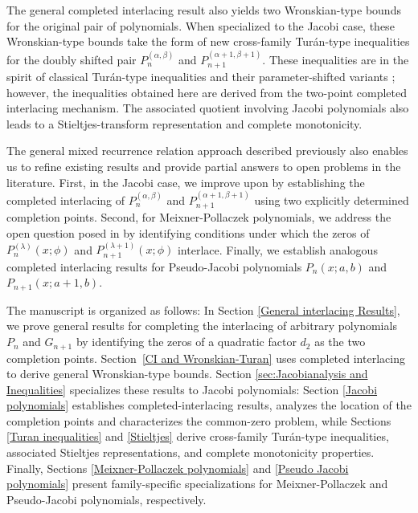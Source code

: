 \documentclass[final,3p,times,12pt]{elsarticle}
\numberwithin{equation}{section}  %
\begin{document}
		
		The general completed interlacing result also yields two  Wronskian-type bounds for the original pair of polynomials.  When specialized to the Jacobi case, these Wronskian-type bounds take the form of
			new cross-family Tur\'an-type inequalities for the doubly shifted pair
			$P_n^{(\alpha,\beta)}$ and $P_{n+1}^{(\alpha+1,\beta+1)}$.  These inequalities
			are in the spirit of classical Tur\'an-type inequalities and their
			parameter-shifted variants
			\cite{ BustozJMMA1981,Gasper1972-PAMS-Turaninequality-Jacobipolynomials, Szego1948-Turaninequality};
			however, the inequalities obtained here are derived from the two-point completed interlacing mechanism. The associated quotient involving Jacobi polynomials also leads to a Stieltjes-transform representation and complete monotonicity.
            
		
        The general mixed recurrence relation approach described previously also enables us to refine existing results and provide partial answers to open
		problems in the literature. First, in the Jacobi case, we improve upon
		 \cite[Theorem~2]{Arvesu-Driver-Littlejohn-RamanujanJ-2023} by establishing the completed interlacing of
		$P_n^{(\alpha,\beta)}$ and $P_{n+1}^{(\alpha+1,\beta+1)}$ using two explicitly
		determined completion points. Second, for Meixner-Pollaczek polynomials, we address the open question posed in
		\cite{Jooste-Jordaan-Numeralg-2025} by identifying
		conditions under which the zeros of $P_n^{(\lambda)}(x;\phi)$ and
		$P_{n+1}^{(\lambda+1)}(x;\phi)$ interlace.  Finally, we establish analogous
		completed interlacing results for Pseudo-Jacobi polynomials
		$P_n(x;a,b)$ and $P_{n+1}(x;a+1,b)$.
	
	The manuscript is organized as follows: In Section \ref{General interlacing Results}, we prove general results for completing the interlacing of arbitrary polynomials $P_n$ and $G_{n+1}$ by identifying the zeros of a quadratic factor $d_2$ as the two completion points.  Section~\ref{CI and Wronskian-Turan} uses completed interlacing to derive general Wronskian-type bounds. Section \ref{sec:Jacobianalysis and Inequalities} specializes these results to Jacobi polynomials: Section \ref{Jacobi polynomials} establishes completed-interlacing results, analyzes the location of the completion points and characterizes the common-zero problem, while Sections \ref{Turan inequalities} and \ref{Stieltjes} derive cross-family Tur\'an-type inequalities, associated Stieltjes representations, and complete monotonicity properties. Finally, Sections \ref{Meixner-Pollaczek polynomials} and \ref{Pseudo Jacobi polynomials} present family-specific specializations for Meixner-Pollaczek and Pseudo-Jacobi polynomials, respectively.
\end{document}
